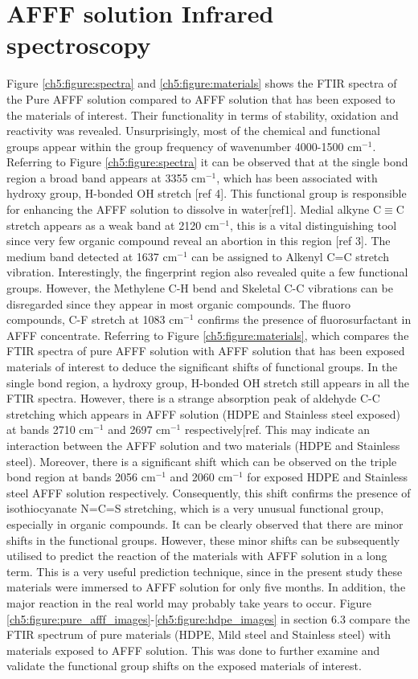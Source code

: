 \documentclass[12pt]{report}
\begin{document}
\section{AFFF solution Infrared spectroscopy}
Figure \ref{ch5:figure:spectra} and \ref{ch5:figure:materials} shows the FTIR spectra of the Pure AFFF solution compared to AFFF solution that has been exposed to the materials of interest.  Their functionality in terms of stability, oxidation and reactivity was revealed. Unsurprisingly, most of the chemical and functional groups appear within the group frequency of wavenumber 4000-1500 cm$^{-1}$.
Referring to Figure \ref{ch5:figure:spectra} it can be observed that at the single bond region a broad band appears at 3355 cm$^{-1}$, which has been associated with hydroxy group, H-bonded OH stretch [ref 4]. This functional group is responsible for enhancing the AFFF solution to dissolve in water[ref1].  Medial alkyne C$\equiv$C stretch appears as a weak band at 2120 cm$^{-1}$, this is a vital distinguishing tool since very few organic compound reveal an abortion in this region [ref 3]. The medium band detected at 1637 cm$^{-1}$ can be assigned to Alkenyl C=C stretch vibration. Interestingly, the fingerprint region also revealed quite a few functional groups. However, the Methylene C-H bend and Skeletal C-C vibrations can be disregarded since they appear in most organic compounds. The fluoro compounds, C-F stretch at 1083 cm$^{-1}$ confirms the presence of fluorosurfactant in AFFF concentrate. 
Referring to Figure \ref{ch5:figure:materials}, which compares the FTIR spectra of pure AFFF solution with AFFF solution that has been exposed materials of interest to deduce the significant shifts of functional groups. In the single bond region, a hydroxy group, H-bonded OH stretch still appears in all the FTIR spectra. However, there is a strange absorption peak of aldehyde C-C stretching which appears in AFFF solution (HDPE and Stainless steel exposed) at bands 2710 cm$^{-1}$  and 2697 cm$^{-1}$ respectively[ref. This may indicate an interaction between the AFFF solution and two materials (HDPE and Stainless steel). Moreover, there is a significant shift which can be observed on the triple bond region at bands 2056 cm$^{-1}$ and 2060 cm$^{-1}$ for exposed HDPE and Stainless steel AFFF solution respectively. Consequently, this shift confirms the presence of isothiocyanate N=C=S stretching, which is a very unusual functional group, especially in organic compounds.
It can be clearly observed that there are minor shifts in the functional groups. However, these minor shifts can be subsequently utilised to predict the reaction of the materials with AFFF solution in a long term. This is a very useful prediction technique, since in the present study these materials were immersed to AFFF solution for only five months. In addition, the major reaction in the real world may probably take years to occur. Figure \ref{ch5:figure:pure_afff_images}-\ref{ch5:figure:hdpe_images} in section 6.3 compare the FTIR spectrum of pure materials (HDPE, Mild steel and Stainless steel) with materials exposed to AFFF solution. This was done to further examine and validate the functional group shifts on the exposed materials of interest.  
\end{document}
